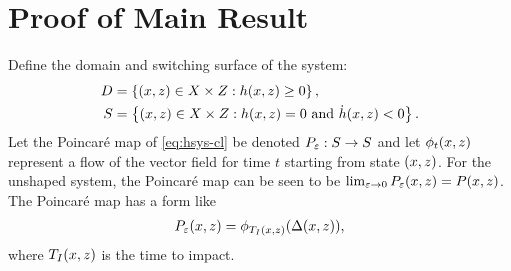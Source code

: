 \documentclass[twocolumn]{article}
\begin{document}
\section{Proof of Main Result}

Define the domain and switching surface of the system:
\begin{align}
  D &= \left\{ (x, z) \in X \times Z : h(x, z) \geq 0 \right\},\\
  \nonumber
  S &= \left\{ (x, z) \in X \times Z : h(x, z) = 0 \mbox{ and } {\dot h}(x, z) < 0 \right\}.
\end{align}
Let the Poincar{\'e} map of \eqref{eq:hsys-cl} be denoted $P_{\varepsilon} : S \to S$ and let $\phi_{t}(x, z)$ represent a flow of the vector field for time $t$ starting from state $(x, z)$.
%
For the unshaped system, the Poincar{\'e} map can be seen to be $\lim_{\varepsilon \to 0} P_{\varepsilon}(x, z) = P(x, z)$.
%
The Poincar{\'e} map has a form like
\begin{align}
  P_{\varepsilon}(x, z) = \phi_{T_{I}(x, z)}(\Delta(x, z)),
\end{align}
where $T_{I}(x, z)$ is the time to impact.
\end{document}
